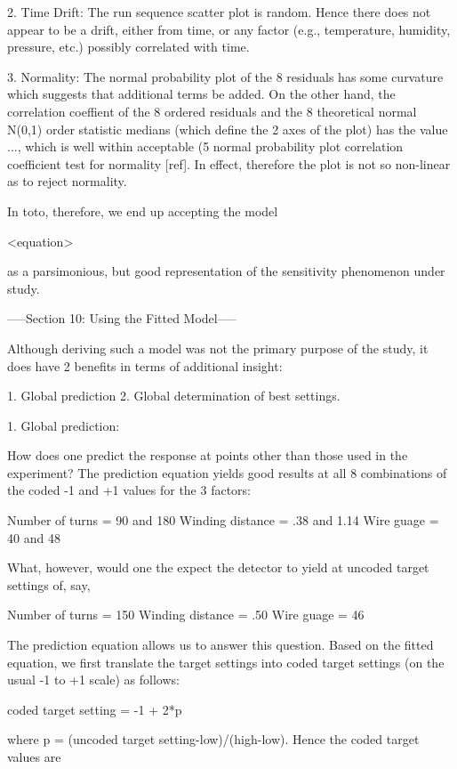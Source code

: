 2. Time Drift:
   The run sequence scatter plot is random.  Hence
   there does not appear to be a drift, either
   from time, or any factor (e.g., temperature,
   humidity, pressure, etc.) possibly correlated
   with time.

3. Normality:
   The normal probability plot of the 8 residuals
   has some curvature which suggests that
   additional terms be added.  On the other hand,
   the correlation coeffient of the 8 ordered
   residuals and the 8 theoretical normal N(0,1)
   order statistic medians (which define the 2
   axes of the plot) has the value ..., which is
   well within acceptable (5%
   normal probability plot correlation coefficient
   test for normality [ref].  In effect, therefore
   the plot is not so non-linear as to reject
   normality.

In toto, therefore, we end up accepting the model

<equation>

as a parsimonious, but good representation of the
sensitivity phenomenon under study.

-----Section 10: Using the Fitted Model-----

Although deriving such a model was not the primary
purpose of the study, it does have 2 benefits in
terms of additional insight:

   1. Global prediction
   2. Global determination of best settings.

1. Global prediction:

How does one predict the response at points other
than those used in the experiment?  The prediction
equation yields good results at all 8 combinations
of the coded -1 and +1 values for the 3 factors:

   Number of turns = 90 and 180
   Winding distance = .38 and 1.14
   Wire guage = 40 and 48

What, however, would one the expect the detector to yield
at uncoded target settings of, say,

   Number of turns = 150
   Winding distance = .50
   Wire guage = 46

The prediction equation allows us to answer this question.
Based on the fitted equation, we first translate
the target settings into coded target settings (on the usual
-1 to +1 scale) as follows:

   coded target setting = -1 + 2*p

where p = (uncoded target setting-low)/(high-low).  Hence the
coded target values are

